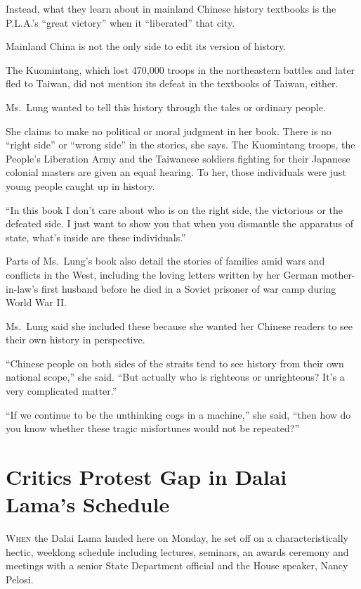 ﻿\documentclass[12pt]{article}
\begin{document}
Instead, what they learn about in mainland Chinese history textbooks is the P.L.A.'s ``great
victory'' when it ``liberated'' that city.

Mainland China is not the only side to edit its version of history.

The Kuomintang, which lost 470,000 troops in the northeastern battles and later fled to Taiwan, did
not mention its defeat in the textbooks of Taiwan, either.

Ms.~Lung wanted to tell this history through the tales or ordinary people.

She claims to make no political or moral judgment in her book. There is no ``right side'' or ``wrong
side'' in the stories, she says. The Kuomintang troops, the People's Liberation Army and the
Taiwanese soldiers fighting for their Japanese colonial masters are given an equal hearing. To her,
those individuals were just young people caught up in history.

``In this book I don't care about who is on the right side, the victorious or the defeated side. I
just want to show you that when you dismantle the apparatus of state, what's inside are these
individuals.''

Parts of Ms.~Lung's book also detail the stories of families amid wars and conflicts in the West,
including the loving letters written by her German mother-in-law's first husband before he died in a
Soviet prisoner of war camp during World War II.

Ms.~Lung said she included these because she wanted her Chinese readers to see their own history in
perspective.

``Chinese people on both sides of the straits tend to see history from their own national scope,''
she said. ``But actually who is righteous or unrighteous? It's a very complicated matter.''

``If we continue to be the unthinking cogs in a machine,'' she said, ``then how do you know whether
these tragic misfortunes would not be repeated?''

\section{Critics Protest Gap in Dalai Lama's Schedule}

\lettrine{W}{hen} the Dalai Lama landed here on Monday, he set off on a
characteristically hectic, weeklong schedule including lectures, seminars, an awards ceremony and
meetings with a senior State Department official and the House speaker, Nancy Pelosi.
\end{document}
